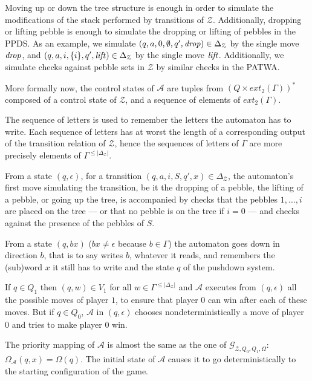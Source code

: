 \documentclass[a4paper,UKenglish,cleveref, autoref, thm-restate]{lipics-v2021}
\renewcommand{\A}{\mathcal{A}}
\begin{document}
Moving up or down the tree structure is enough in order to simulate the modifications of the stack
performed by transitions of $\mathcal{Z}$. Additionally, dropping or lifting pebble is enough to simulate the dropping or lifting of pebbles in the PPDS. As an example, we simulate
$(q, a, 0, \emptyset, q', \text{\textit{drop}})  \in   \Delta_{\mathcal{Z}} $ by the single move $\text{\textit{drop}}$, and
$(q, a, i, \{i\}, q', \text{\textit{lift}})  \in   \Delta_{\mathcal{Z}} $ by the single move 
$\text{\textit{lift}}$. Additionally, we simulate checks against pebble sets in $\mathcal{Z}$ by similar checks in the PATWA.


More formally now, the control states of $\mathcal{A}$ are tuples
from $( Q \times ext_2(\Gamma) )^*$  
composed of a control state of  $\mathcal{Z}$, and
a sequence of elements of $ ext_2(\Gamma)$.

The sequence of letters is used to remember the letters the automaton has to write. 
Each sequence of letters has at worst the length of a corresponding output of the transition relation of $\mathcal{Z}$, hence the sequences of letters of $\Gamma$ are more precisely elements of $\Gamma^{ \leq |\Delta_{\mathcal{Z}}|}$.  


From a state $(q, \epsilon)$, for a transition
$(q, a, i, S, q', x) \in \Delta_{\mathcal{Z}}$,
the automaton's first move simulating the transition, be it the dropping of a pebble, the lifting of a pebble, or going up the tree, is accompanied by 
checks that the pebbles $1, \ldots, i$ are placed on the tree \---- or that no pebble is on the tree if $i=0$ \---- and checks against the presence of the pebbles of $S$.

From a state $(q , bx)$ ($bx \neq \epsilon$ because $b  \in  \Gamma$) the automaton goes down
in direction $b$, that is to say writes $b$, whatever it reads, and remembers the
(sub)word $x$ it still has to write and the state $q$ of the pushdown system. 


If $q  \in  Q_1$ then $ (q,w)  \in  V_1$ for all $w \in \Gamma^{ \leq |\Delta_{\mathcal{Z}}|}$
and
$\mathcal{A}$
executes from $(q,\epsilon)$ all the possible moves of player $1$, to ensure that player $0$ can win after
each of these moves. But if $q  \in  Q_0$, $\mathcal{A}$ in $(q,\epsilon)$ chooses nondeterministically a move of
player $0$ and tries to make player $0$ win. \newline


The priority mapping of $\mathcal{A}$ is almost the same as the one of 
$\mathcal{G}_{\mathcal{Z},Q_0,Q_1,\Omega}$: 
$\Omega_\A(q, x) =
\Omega (q)$. 
The initial state of $\mathcal{A}$ causes it to go deterministically to the starting
configuration of the game.
\end{document}
